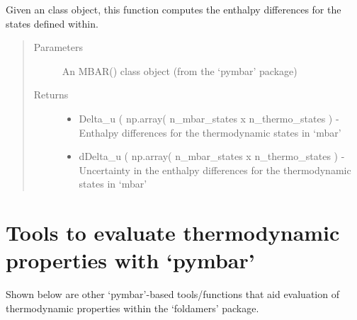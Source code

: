 \documentclass[letterpaper,12pt,english,openany,oneside]{sphinxmanual}
\begin{document}
\begin{fulllineitems}
\label{\detokenize{thermo:parameters.reweight.get_enthalpy_differences}}
Given an  class object, this function computes the enthalpy differences for the states defined within.
\begin{quote}\begin{description}
\item[{Parameters}] \leavevmode
{} \textendash{} An MBAR() class object (from the ‘pymbar’ package)

\item[{Returns}] \leavevmode
\begin{itemize}
\item {} 
Delta\_u ( np.array( n\_mbar\_states x n\_thermo\_states ) - Enthalpy differences for the thermodynamic states in ‘mbar’

\item {} 
dDelta\_u ( np.array( n\_mbar\_states x n\_thermo\_states ) - Uncertainty in the enthalpy differences for the thermodynamic states in ‘mbar’

\end{itemize}


\end{description}\end{quote}

\end{fulllineitems}


\newpage


\section{Tools to evaluate thermodynamic properties with ‘pymbar’}
\label{\detokenize{thermo:tools-to-evaluate-thermodynamic-properties-with-pymbar}}
Shown below are other ‘pymbar’-based tools/functions that aid evaluation of thermodynamic properties within the ‘foldamers’ package.

\label{\detokenize{thermo:module-parameters.reweight}}
\end{document}
